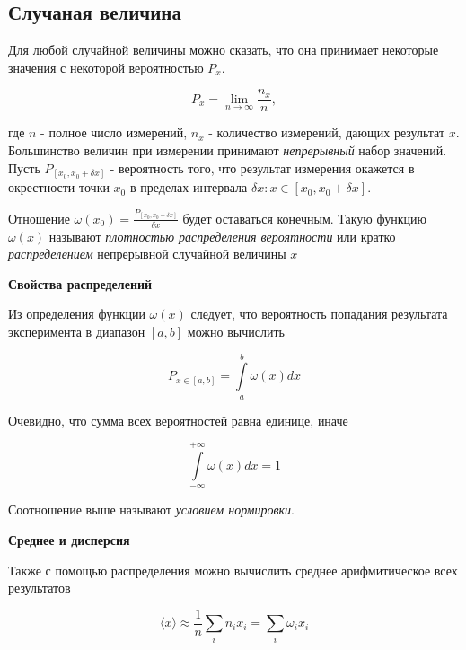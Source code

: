 \documentclass[12pt]{article}
\begin{document}
    \subsection{Случаная величина}

      Для любой случайной величины можно сказать, что она принимает некоторые
      значения с некоторой вероятностью $P_x$.

      $$
        P_x = \lim_{n \rightarrow \infty} \frac{n_x}{n},
      $$

      где $n$ - полное число измерений, $n_x$ - количество измерений, дающих
      результат $x$. Большинство величин при измерении принимают \textit{непрерывный}
      набор значений. Пусть $P_{[x_0, x_0 + \delta x]}$ - вероятность того, что
      результат измерения окажется в окрестности точки $x_0$ в пределах интервала
      $\delta x: x \in [x_0, x_0 + \delta x]$.

      Отношение $\omega (x_0) = \frac{P_{[x_0, x_0 + \delta x]}}{\delta x}$
      будет оставаться конечным. Такую функцию $\omega (x)$ называют
      \textit{плотностью распределения вероятности} или кратко \textit{распределением}
      непрерывной случайной величины $x$

      \vspace{1cm}

      \textbf{Свойства распределений}

        Из определения функции $\omega (x)$ следует, что вероятность попадания
        результата эксперимента в диапазон $[a, b]$ можно вычислить

        \begin{equation}
          P_{x \in [a, b]} = \int \limits_a^b \omega (x) dx
        \end{equation}

        Очевидно, что сумма всех вероятностей равна единице, иначе

        $$
          \int \limits_{- \infty}^{+ \infty} \omega (x) dx = 1
        $$

        Соотношение выше называют \textit{условием нормировки}.

      \vspace{1cm}

      \textbf{Среднее и дисперсия}

        Также с помощью распределения можно вычислить среднее арифмитическое
        всех результатов

        $$
          \langle x \rangle \approx \frac{1}{n} \sum_{i} n_i x_i =
          \sum_{i} \omega_{i} x_i
        $$
\end{document}
